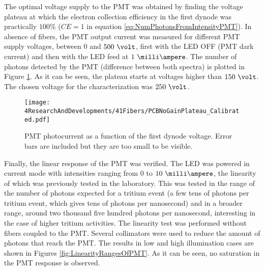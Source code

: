 

The optimal voltage supply to the PMT was obtained by finding the voltage plateau at which the electron collection efficiency in the first dynode was practically $100\%$ ($CE=1$ in equation \ref{eq:NumPhotonsFromIntensityPMT}). In absence of fibers, the PMT output current was measured for different PMT supply voltages, between $0$ and $500~\volt$, first with the LED OFF (PMT dark current) and then with the LED feed at $1~\milli\ampere$. The number of photons detected by the PMT (difference between both spectra) is plotted in Figure \ref{fig:PlateauNoGainPMT}. As it can be seen, the plateau starts at voltages higher than $150~\volt$. The chosen voltage for the characterization was $250~\volt$.

\begin{figure}[h]
\centering
\texttt{[image: 4ResearchAndDevelopments/41Fibers/PCBNoGainPlateau\_Calibrated.pdf]}
\caption{PMT photocurrent as a function of the first dynode voltage. Error bars are included but they are too small to be visible.\label{fig:PlateauNoGainPMT}}
\end{figure}

Finally, the linear response of the PMT was verified. The LED was powered in current mode with intensities ranging from 0 to $10~\milli\ampere$, the linearity of which was previously tested in the laboratory. This was tested in the range of the number of photons expected for a tritium event (a few tens of photons per tritium event, which gives tens of photons per nanosecond) and in a broader range, around two thousand five hundred photons per nanosecond, interesting in the case of higher tritium activities. The linearity test was performed without fibers coupled to the PMT. Several collimators were used to reduce the amount of photons that reach the PMT. The results in low and high illumination cases are shown in Figures \ref{fig:LinearityRangesOfPMT}. As it can be seen, no saturation in the PMT response is observed.

